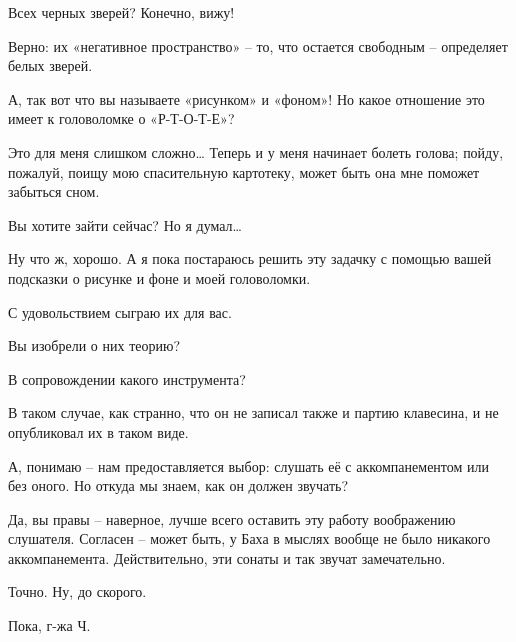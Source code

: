 \documentclass[../main.tex]{subfiles}
\begin{document}
\begin{dialogue}
 Всех черных зверей? Конечно, вижу!

 Верно: их «негативное пространство» \--- то, что остается свободным \--- определяет белых зверей.

 А, так вот что вы называете «рисунком» и «фоном»! Но какое отношение это имеет к головоломке о «Р-Т-О-Т-Е»?

 Это для меня слишком сложно\ldots{} Теперь и у меня начинает болеть голова; пойду, пожалуй, поищу мою спасительную картотеку, может быть она мне поможет забыться сном.

 Вы хотите зайти сейчас? Но я думал\ldots{}

 Ну что ж, хорошо. А я пока постараюсь решить эту задачку с помощью вашей подсказки о рисунке и фоне и моей головоломки.

 С удовольствием сыграю их для вас.

 Вы изобрели о них теорию?

 В сопровождении какого инструмента?

 В таком случае, как странно, что он не записал также и партию клавесина, и не опубликовал их в таком виде.

 А, понимаю \--- нам предоставляется выбор: слушать её с аккомпанементом или без оного. Но откуда мы знаем, как он должен звучать?

 Да, вы правы \--- наверное, лучше всего оставить эту работу воображению слушателя. Согласен \--- может быть, у Баха в мыслях вообще не было никакого аккомпанемента. Действительно, эти сонаты и так звучат замечательно.

 Точно. Ну, до скорого.

 Пока, г-жа Ч.

\end{dialogue}
\end{document}
